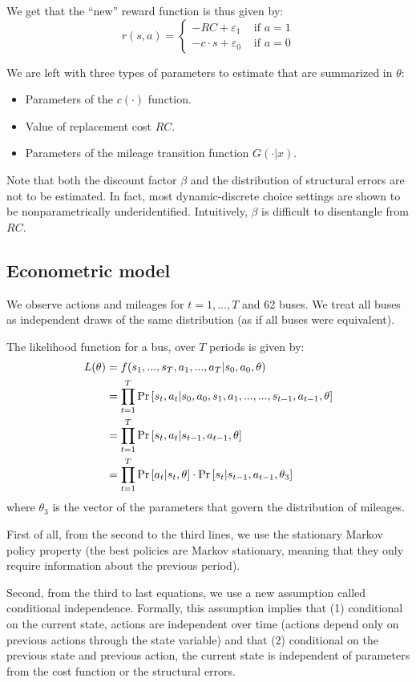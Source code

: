 We get that the ``new'' reward function is thus given by: $$ r(s, a) = \begin{cases} - RC + \varepsilon_1 & \text{ if } a = 1 \\ - c \cdot s + \varepsilon_0 & \text{ if } a = 0 \end{cases} $$

We are left with three types of parameters to estimate that are summarized in $\theta$: \begin{itemize}
\item Parameters of the $c(\cdot)$ function.
\item Value of replacement cost $RC$.
\item Parameters of the mileage transition function $G(\cdot|x)$.
\end{itemize}

Note that both the discount factor $\beta$ and the distribution of structural errors are not to be estimated. In fact, most dynamic-discrete choice settings are shown to be nonparametrically underidentified. Intuitively, $\beta$ is difficult to disentangle from $RC$.

\subsection{Econometric model}

We observe actions and mileages for $t=1, ..., T$ and 62 buses. We treat all buses as independent draws of the same distribution (as if all buses were equivalent).

The likelihood function for a bus, over $T$ periods is given by: \begin{align*}
L(\theta) & = f(s_1, ..., s_T, a_1, ..., a_T|s_0, a_0, \theta) \\ 
& = \prod_{t=1}^T \operatorname{Pr}\left[s_t, a_t| s_0, a_0, s_1, a_1, ..., ..., s_{t-1}, a_{t-1}, \theta\right] \\
& = \prod_{t=1}^T \operatorname{Pr}\left[s_t, a_t| s_{t-1}, a_{t-1}, \theta\right] \\
& = \prod_{t=1}^T \operatorname{Pr}\left[a_t| s_t, \theta\right] \cdot \operatorname{Pr}\left[s_t | s_{t-1}, a_{t-1}, \theta_3\right]
\end{align*} where $\theta_3$ is the vector of the parameters that govern the distribution of mileages.

First of all, from the second to the third lines, we use the stationary Markov policy property (the best policies are Markov stationary, meaning that they only require information about the previous period). 

Second, from the third to last equations, we use a new assumption called conditional independence. Formally, this assumption implies that (1) conditional on the current state, actions are independent over time (actions depend only on previous actions through the state variable) and that (2) conditional on the previous state and previous action, the current state is independent of parameters from the cost function or the structural errors.

